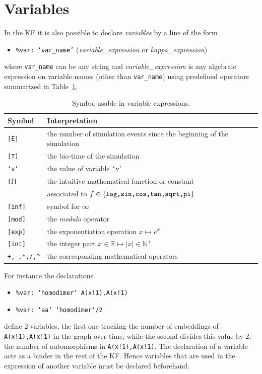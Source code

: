 \documentclass[11pt]{book}
\def\ttt#1{\texttt{#1}}
\def\noi{\noindent}
\def\set#1{\{#1\}}
\def\ITE#1{\begin{itemize}#1\end{itemize}}
\def\Real{\mathbb R}
\def\Nat{\mathbb N}
\begin{document}
\section{Variables}\label{sec:var}

In the KF it is also possible to declare \emph{variables} by a line of the form
\ITE{
\item[] \ttt{\%var: `var\_name'} (\textit{variable\_expression} or \textit{kappa\_expression})
}
where \ttt{var\_name} can be any string and \textit{variable\_expression} is any algebraic expression on variable names (other than \ttt{var\_name})  using predefined operators summarized in Table~\ref{tab:operators}.

\begin{table}[htbp]
\centering
\begin{tabular}{@{} l|l @{} }
\toprule
Symbol & Interpretation \\
\midrule
\ttt{[E]} & the number of simulation events\index{event} since the beginning of the simulation\\
\ttt{[T]} & the bio-time of the simulation \\
\ttt{`v'} & the value of variable {\ttt `v'} \\
\ttt{[}f\texttt{]} & the intuitive mathematical function or constant \\ &associated to $f\in\set{\hbox{\ttt{log,sin,cos,tan,sqrt,pi}}}$ \\
\ttt{[inf]} & symbol for $\infty$ \\
\ttt{[mod]} & the \emph{modulo} operator \\
\ttt{[exp]} & the exponentiation operation $x\mapsto e^x$ \\
\ttt{[int]} & the integer part $x\in\Real\mapsto |x|\in\Nat^+$ \\
\ttt{+,-,*,/,\^} & the corresponding mathematical operators\\
\bottomrule
\end{tabular}\caption{Symbol usable in variable expressions.}
\label{tab:operators}
\end{table}
\noi For instance the declarations
\ITE{
\item[] \ttt{\%var: `homodimer' A(x!1),A(x!1)}
\item[] \ttt{\%var: `aa' `homodimer'/2}
}
define 2 variables, the first one tracking the number of embeddings of \ttt{A(x!1),A(x!1)} in the graph over time, while the second divides this value by 2: the number of automorphisms in \ttt{A(x!1),A(x!1)}. The declaration of a variable acts as a binder in the rest of the KF. Hence variables that are used in the expression of another variable must be declared beforehand. 
\end{document}
